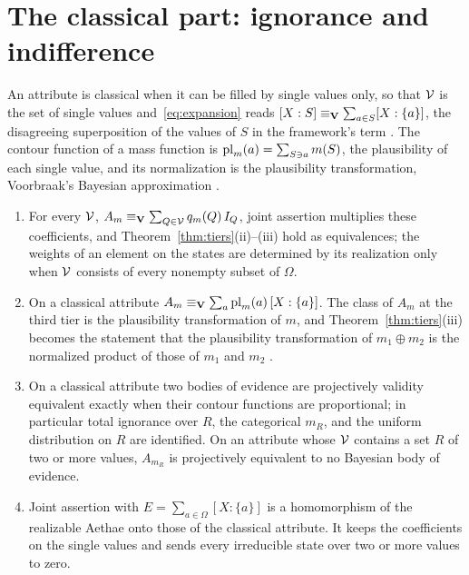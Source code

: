 \section{The classical part: ignorance and indifference}\label{sec:classical}

An attribute is classical when it can be filled by single values only, so that $\mathcal{V}$ is the set of single values and~\eqref{eq:expansion} reads $[X:S] \equiv_{\mathbf{V}} \sum_{a \in S} [X:\{a\}]$, the disagreeing superposition of the values of $S$ in the framework's term \cite{Aethus}. The contour function of a mass function is $\mathrm{pl}_m(a) = \sum_{S \ni a} m(S)$, the plausibility of each single value, and its normalization is the plausibility transformation, Voorbraak's Bayesian approximation \cite{voorbraak1989, cobb2006}.

\begin{proposition}\label{prop:classical}
\begin{enumerate}
\item[(i)] For every $\mathcal{V}$, $A_m \equiv_{\mathbf{V}} \sum_{Q \in \mathcal{V}} q_m(Q)\, I_Q$, joint assertion multiplies these coefficients, and Theorem~\ref{thm:tiers}(ii)--(iii) hold as equivalences; the weights of an element on the states are determined by its realization only when $\mathcal{V}$ consists of every nonempty subset of $\Omega$.
\item[(ii)] On a classical attribute $A_m \equiv_{\mathbf{V}} \sum_{a} \mathrm{pl}_m(a)\, [X:\{a\}]$. The class of $A_m$ at the third tier is the plausibility transformation of $m$, and Theorem~\ref{thm:tiers}(iii) becomes the statement that the plausibility transformation of $m_1 \oplus m_2$ is the normalized product of those of $m_1$ and $m_2$ \cite[Theorem~5.1]{cobb2006}.
\item[(iii)] On a classical attribute two bodies of evidence are projectively validity equivalent exactly when their contour functions are proportional; in particular total ignorance over $R$, the categorical $m_R$, and the uniform distribution on $R$ are identified. On an attribute whose $\mathcal{V}$ contains a set $R$ of two or more values, $A_{m_R}$ is projectively equivalent to no Bayesian body of evidence.
\item[(iv)] Joint assertion with $E = \sum_{a \in \Omega} [X:\{a\}]$ is a homomorphism of the realizable Aethae onto those of the classical attribute. It keeps the coefficients on the single values and sends every irreducible state over two or more values to zero.
\end{enumerate}
\end{proposition}

